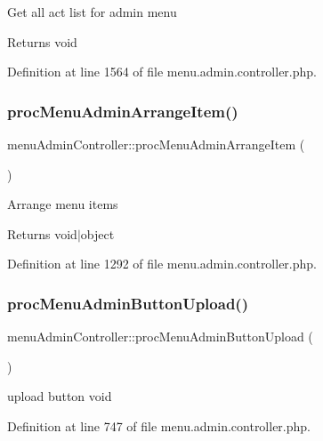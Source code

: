Get all act list for admin menu \begin{DoxyReturn}{Returns}
void 
\end{DoxyReturn}


Definition at line 1564 of file menu.\+admin.\+controller.\+php.

\hypertarget{classmenuAdminController_ac803e1a5fb5bf35e30f20d727afb89dd}{}\label{classmenuAdminController_ac803e1a5fb5bf35e30f20d727afb89dd} 
\subsubsection{\texorpdfstring{proc\+Menu\+Admin\+Arrange\+Item()}{procMenuAdminArrangeItem()}}
{\footnotesize\ttfamily menu\+Admin\+Controller\+::proc\+Menu\+Admin\+Arrange\+Item (\begin{DoxyParamCaption}{ }\end{DoxyParamCaption})}

Arrange menu items \begin{DoxyReturn}{Returns}
void$\vert$object 
\end{DoxyReturn}


Definition at line 1292 of file menu.\+admin.\+controller.\+php.

\hypertarget{classmenuAdminController_a733cac454885536a8cd2d1b5c625109a}{}\label{classmenuAdminController_a733cac454885536a8cd2d1b5c625109a} 
\subsubsection{\texorpdfstring{proc\+Menu\+Admin\+Button\+Upload()}{procMenuAdminButtonUpload()}}
{\footnotesize\ttfamily menu\+Admin\+Controller\+::proc\+Menu\+Admin\+Button\+Upload (\begin{DoxyParamCaption}{ }\end{DoxyParamCaption})}

upload button  void 

Definition at line 747 of file menu.\+admin.\+controller.\+php.

